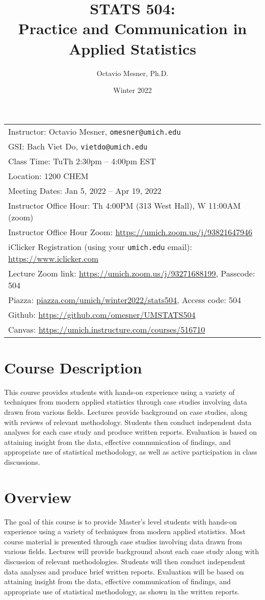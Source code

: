 \documentclass[11pt]{article}
\title{STATS 504: \\ Practice and Communication in Applied Statistics}
\author{Octavio Mesner, Ph.D.}
\date{Winter 2022}
\begin{document}
\maketitle
\begin{tabular}{l}
Instructor: Octavio Mesner, \texttt{omesner@umich.edu} \\
GSI: Bach Viet Do, \texttt{vietdo@umich.edu} \\
Class Time: TuTh 2:30pm -- 4:00pm EST \\
Location: 1200 CHEM \\
Meeting Dates: Jan 5, 2022 -- Apr 19, 2022\\
Instructor Office Hour: Th 4:00PM (313 West Hall), W 11:00AM (zoom) \\
Instructor Office Hour Zoom: \url{https://umich.zoom.us/j/93821647946} \\
iClicker Registration (using your \texttt{umich.edu} email): \url{https://www.iclicker.com} \\
Lecture Zoom link: \url{https://umich.zoom.us/j/93271688199}, Passcode: 504 \\
Piazza: \url{piazza.com/umich/winter2022/stats504}, Access code: 504 \\
Github: \url{https://github.com/omesner/UMSTATS504} \\
Canvas: \url{https://umich.instructure.com/courses/516710}
\end{tabular}

\section*{Course Description}

This course provides students with hands-on experience using a variety of techniques from modern applied statistics through case studies involving data drawn from various fields.
Lectures  provide background on case studies, along with reviews of relevant methodology.
Students then conduct independent data analyses for each case study and produce written reports.
Evaluation is based on attaining insight from the data, effective communication of findings, and appropriate use of statistical methodology, as well as active participation in class discussions.

\section*{Overview}

The goal of this course is to provide Master’s level students with hands-on experience using a variety of techniques from modern applied statistics.
Most course material is presented through case studies involving data drawn from various fields.
Lectures will provide background about each case study along with discussion of relevant methodologies.
Students will then conduct independent data analyses and produce brief written reports.
Evaluation will be based on attaining insight from the data, effective communication of findings, and appropriate use of statistical methodology, as shown in the written reports.
\end{document}
